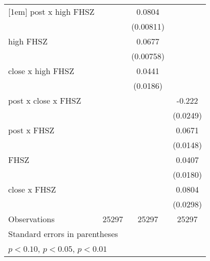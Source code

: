 \begin{table}[htbp]
\begin{tabular}{l*{3}{c}}
[1em]
post x high FHSZ    &                     &      0.0804\sym{***}&                     \\
                    &                     &   (0.00811)         &                     \\
[1em]
high FHSZ           &                     &      0.0677\sym{***}&                     \\
                    &                     &   (0.00758)         &                     \\
[1em]
close x high FHSZ   &                     &      0.0441\sym{**} &                     \\
                    &                     &    (0.0186)         &                     \\
[1em]
post x close x FHSZ &                     &                     &      -0.222\sym{***}\\
                    &                     &                     &    (0.0249)         \\
[1em]
post x FHSZ         &                     &                     &      0.0671\sym{***}\\
                    &                     &                     &    (0.0148)         \\
[1em]
FHSZ                &                     &                     &      0.0407\sym{*}  \\
                    &                     &                     &    (0.0180)         \\
[1em]
close x FHSZ        &                     &                     &      0.0804\sym{**} \\
                    &                     &                     &    (0.0298)         \\
\hline
Observations        &       25297         &       25297         &       25297         \\
\hline\hline
\multicolumn{4}{l}{\footnotesize Standard errors in parentheses}\\
\multicolumn{4}{l}{\footnotesize \sym{*} \(p<0.10\), \sym{**} \(p<0.05\), \sym{***} \(p<0.01\)}\\
\end{tabular}
\end{table}
